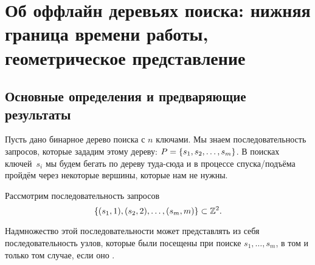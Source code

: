 \section{Об оффлайн деревьях поиска: нижняя граница времени работы, геометрическое представление}

\subsection{Основные определения и предваряющие результаты}

Пусть дано бинарное дерево поиска с $n$ ключами. Мы знаем последовательность запросов, которые зададим этому дереву: $P = \lbrace s_1,s_2,\ldots,s_m\rbrace$. В поисках ключей~$s_i$ мы будем бегать по дереву туда-сюда и в процессе спуска/подъёма пройдём через некоторые вершины, которые нам не нужны.





\begin{theorem}
	Рассмотрим последовательность запросов
	\begin{equation*}
		\lbrace(s_1,1),(s_2,2),\ldots,(s_m,m)\rbrace \subset {\mathbb Z}^2.
	\end{equation*}

	Надмножество этой последовательности может представлять из себя последовательность узлов, которые были посещены при поиске $s_1, \ldots, s_m$, в том и только том случае, если оно \arbs.
\end{theorem}



